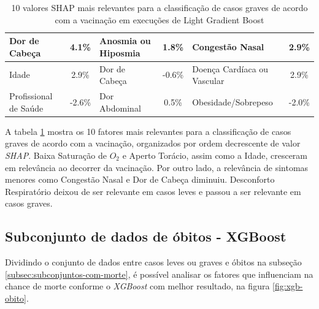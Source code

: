 \begin{table}[H]
\begin{tabular}{|l|c|l|c|l|c|}
  Dor de Cabeça                                & 4.1\%        & Anosmia ou Hiposmia                                                         & 1.8\%                                        & Congestão Nasal                                            & 2.9\%                       \\ \hline
  Idade                                        & 2.9\%        & Dor de Cabeça                                                               & -0.6\%                                       & Doença Cardíaca ou Vascular                                & 2.9\%                       \\ \hline
  Profissional de Saúde                        & -2.6\%       & Dor Abdominal                                                               & 0.5\%                                        & Obesidade/Sobrepeso                                        & -2.0\%                      \\ \hline
  \end{tabular}
  \caption{\textmd{10 valores SHAP mais relevantes para a classificação de casos graves de acordo com a vacinação em execuções de Light Gradient Boost}}
  \label{tab:shap-relevancias2}
  \end{table}

A tabela \ref{tab:shap-relevancias2} mostra os 10 fatores mais relevantes para a classificação de casos graves de acordo com a vacinação, organizados por ordem decrescente de valor \textit{SHAP}. Baixa Saturação de $O_2$ e Aperto Torácio, assim como a Idade, cresceram em relevância ao decorrer da vacinação. Por outro lado, a relevância de sintomas menores como Congestão Nasal e Dor de Cabeça diminuiu. Desconforto Respiratório deixou de ser relevante em casos leves e passou a ser relevante em casos graves.

\subsection{Subconjunto de dados de óbitos - XGBoost}
\label{subsec:xgb-obitos}

Dividindo o conjunto de dados entre casos leves ou graves e óbitos na subseção \ref{subsec:subconjuntos-com-morte}, é possível analisar os fatores que influenciam na chance de morte conforme o \textit{XGBoost} com melhor resultado, na figura \ref{fig:xgb-obito}.

